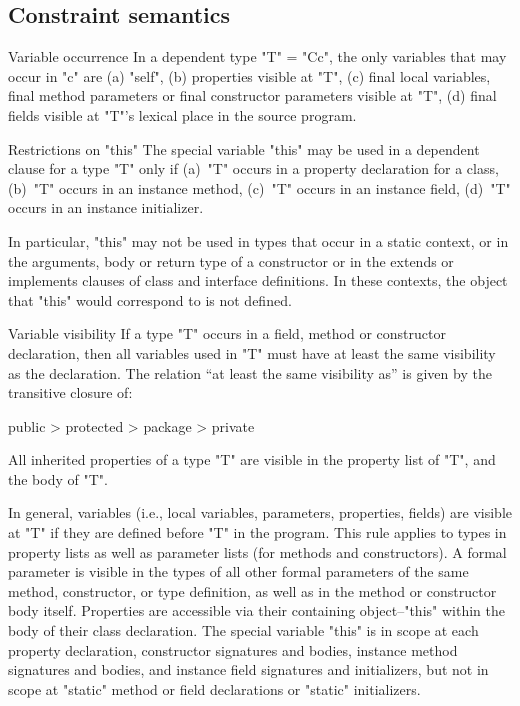 

\subsection{Constraint semantics}

\begin{staticrule}{Variable occurrence}
In a dependent type \xcd"T" = \xcd"C{c}", the only variables that may
occur in \xcd"c" are (a)
\xcd"self", (b) properties visible at \xcd"T", (c) final local variables, final
method parameters or final constructor parameters visible at \xcd"T", (d)
final fields visible at \xcd"T"'s lexical place in the source program.  
\end{staticrule}

\begin{staticrule}{Restrictions on \xcd"this"}
  The special variable \xcd"this" may be used in a dependent clause for a type \xcd"T"
  only if (a)~\xcd"T" occurs in a property declaration for a
  class, (b)~\xcd"T"
  occurs in an instance method, (c)~\xcd"T" occurs in an
  instance field, (d)~\xcd"T"
  occurs in an instance initializer.

  In particular, \xcd"this" may not be used in types that occur in a static
  context, or in the arguments, body or return type of a constructor or
  in the extends or implements clauses of class and interface
  definitions.  In these contexts, the object that \xcd"this" would
  correspond to is not defined.
\end{staticrule}

\begin{staticrule}{Variable visibility}
  If a type \xcd"T" occurs in a field, method or constructor
  declaration, then all variables used in \xcd"T" must have at least the
  same visibility as the declaration.  The relation ``at least the same
  visibility as'' is given by the transitive closure of:

\begin{xten}
public > protected > package > private
\end{xten}

All inherited properties of a type \xcd"T" are visible in the property
list of \xcd"T", and the body of \xcd"T".

\end{staticrule}

In general, variables (i.e., local variables, parameters,
properties, fields) are visible at
\xcd"T" if they are defined before \xcd"T" in the program. This rule applies to
types in property lists as well as parameter lists (for methods and
constructors).
A formal parameter is visible in the types of all other formal
parameters of the same method, constructor, or type definition,
as well as in the method or constructor body itself.
Properties are accessible via their containing object--\xcd"this"
within the body of their class declaration.  The special
variable \xcd"this" is in scope at each property
declaration, constructor signatures and bodies, instance method signatures
and bodies,
and instance field signatures and initializers, but not in scope
at \xcd"static" method or field declarations or \xcd"static"
initializers.  

